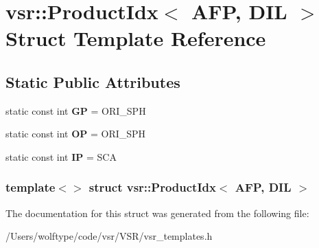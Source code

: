 \hypertarget{structvsr_1_1_product_idx_3_01_a_f_p_00_01_d_i_l_01_4}{\section{vsr\-:\-:Product\-Idx$<$ A\-F\-P, D\-I\-L $>$ Struct Template Reference}
\label{structvsr_1_1_product_idx_3_01_a_f_p_00_01_d_i_l_01_4}
}
\subsection*{Static Public Attributes}
\begin{DoxyCompactItemize}
\item 
\hypertarget{structvsr_1_1_product_idx_3_01_a_f_p_00_01_d_i_l_01_4_ac6c729fc02638f43f343db8e988fc660}{static const int {\bfseries G\-P} = O\-R\-I\-\_\-\-S\-P\-H}\label{structvsr_1_1_product_idx_3_01_a_f_p_00_01_d_i_l_01_4_ac6c729fc02638f43f343db8e988fc660}

\item 
\hypertarget{structvsr_1_1_product_idx_3_01_a_f_p_00_01_d_i_l_01_4_aacd65c64b541a7db8fa6e7fa31ed02f4}{static const int {\bfseries O\-P} = O\-R\-I\-\_\-\-S\-P\-H}\label{structvsr_1_1_product_idx_3_01_a_f_p_00_01_d_i_l_01_4_aacd65c64b541a7db8fa6e7fa31ed02f4}

\item 
\hypertarget{structvsr_1_1_product_idx_3_01_a_f_p_00_01_d_i_l_01_4_a4e594515ce9ccea46196a95315ea865e}{static const int {\bfseries I\-P} = S\-C\-A}\label{structvsr_1_1_product_idx_3_01_a_f_p_00_01_d_i_l_01_4_a4e594515ce9ccea46196a95315ea865e}

\end{DoxyCompactItemize}
\subsubsection*{template$<$$>$ struct vsr\-::\-Product\-Idx$<$ A\-F\-P, D\-I\-L $>$}



The documentation for this struct was generated from the following file\-:\begin{DoxyCompactItemize}
\item 
/\-Users/wolftype/code/vsr/\-V\-S\-R/vsr\-\_\-templates.\-h\end{DoxyCompactItemize}
